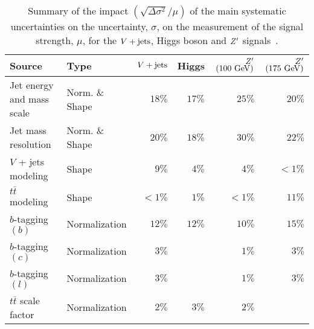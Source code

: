 \begin{table}[htpb]
 \centering
 \caption[Summary of the impact of the main systematic uncertainties on the signal strength uncertainties.]{%
  Summary of the impact $(\sqrt{\Delta \sigma^2}/\mu)$ of the main systematic uncertainties on the uncertainty, $\sigma$, on the measurement of the signal strength, $\mu$, for the $V + \text{jets}$, Higgs boson and $Z'$ signals~\cite{ATLAS-CONF-2018-052}.}
 \begin{tabular}{@{}llrrrr@{}}
  \toprule
  Source                    & Type           & $V + \text{jets}$ & Higgs  & $Z'$ $\left(100~\mathrm{GeV}\right)$ & $Z'$ $\left(175~\mathrm{GeV}\right)$ \\ \midrule
  Jet energy and mass scale & Norm. \& Shape & $18\%$   & $17\%$ &
  $25\%$                    & $20\%$                                                                                                     \\
  Jet mass resolution       & Norm. \& Shape & $20\%$   & $18\%$ & $30\% $
                            & $22\% $                                                                                                    \\
  $V$ + jets modeling       & Shape          & $9\%$    & $4\%$  & $4\%$
                            & $<1\%$                                                                                                     \\
  $t\bar{t}$ modeling       & Shape          & $<1\%$   & $1\%$  & $<1\%$                            &
  $11\%$                                                                                                                                 \\
  $b$-tagging $(b)$         & Normalization  & $12\%$   & $12\%$ & $10\%$                            &
  $15\%$                                                                                                                                 \\
  $b$-tagging $(c)$         & Normalization  & $3\%$    &        & $1\%$
                            & $3\%$                                                                                                      \\
  $b$-tagging $(l)$         & Normalization  & $3\%$    &        & $1\%$
                            & $3\%$                                                                                                      \\
  $t\bar{t}$ scale factor   & Normalization  & $2\%$    & $3\%$  & $2\%$

\end{tabular}
\end{table}

